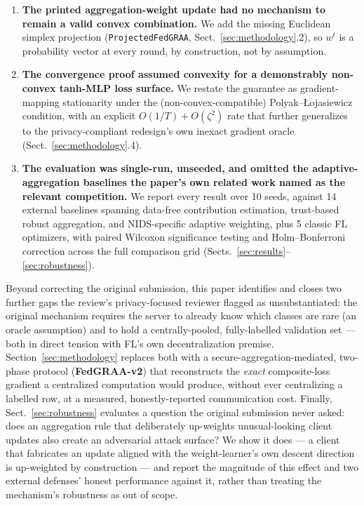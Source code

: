 \documentclass{llncs}
\begin{document}
\begin{enumerate}
\item \textbf{The printed aggregation-weight update had no mechanism to remain a valid convex combination.} We add the missing Euclidean simplex projection (\texttt{ProjectedFedGRAA}, Sect.~\ref{sec:methodology}.2), so $w^t$ is a probability vector at every round, by construction, not by assumption.
\item \textbf{The convergence proof assumed convexity for a demonstrably non-convex tanh-MLP loss surface.} We restate the guarantee as gradient-mapping stationarity under the (non-convex-compatible) Polyak--{\L}ojasiewicz condition, with an explicit $O(1/T) + O(\zeta^2)$ rate that further generalizes to the privacy-compliant redesign's own inexact gradient oracle (Sect.~\ref{sec:methodology}.4).
\item \textbf{The evaluation was single-run, unseeded, and omitted the adaptive-aggregation baselines the paper's own related work named as the relevant competition.} We report every result over 10 seeds, against 14 external baselines spanning data-free contribution estimation, trust-based robust aggregation, and NIDS-specific adaptive weighting, plus 5 classic FL optimizers, with paired Wilcoxon significance testing and Holm--Bonferroni correction across the full comparison grid (Sects.~\ref{sec:results}--\ref{sec:robustness}).
\end{enumerate}

Beyond correcting the original submission, this paper identifies and closes two further gaps the review's privacy-focused reviewer flagged as unsubstantiated: the original mechanism requires the server to already know which classes are rare (an oracle assumption) and to hold a centrally-pooled, fully-labelled validation set --- both in direct tension with FL's own decentralization premise. Section~\ref{sec:methodology} replaces both with a secure-aggregation-mediated, two-phase protocol (\textbf{FedGRAA-v2}) that reconstructs the \emph{exact} composite-loss gradient a centralized computation would produce, without ever centralizing a labelled row, at a measured, honestly-reported communication cost. Finally, Sect.~\ref{sec:robustness} evaluates a question the original submission never asked: does an aggregation rule that deliberately up-weights unusual-looking client updates also create an adversarial attack surface? We show it does --- a client that fabricates an update aligned with the weight-learner's own descent direction is up-weighted by construction --- and report the magnitude of this effect and two external defenses' honest performance against it, rather than treating the mechanism's robustness as out of scope.
\end{document}
